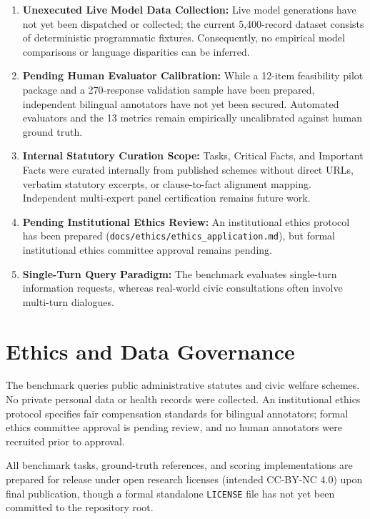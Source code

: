 \documentclass[11pt,a4paper]{article}
\begin{document}
\begin{enumerate}
  \item \textbf{Unexecuted Live Model Data Collection:} Live model generations have not yet been dispatched or collected; the current 5,400-record dataset consists of deterministic programmatic fixtures. Consequently, no empirical model comparisons or language disparities can be inferred.
  \item \textbf{Pending Human Evaluator Calibration:} While a 12-item feasibility pilot package and a 270-response validation sample have been prepared, independent bilingual annotators have not yet been secured. Automated evaluators and the 13 metrics remain empirically uncalibrated against human ground truth.
  \item \textbf{Internal Statutory Curation Scope:} Tasks, Critical Facts, and Important Facts were curated internally from published schemes without direct URLs, verbatim statutory excerpts, or clause-to-fact alignment mapping. Independent multi-expert panel certification remains future work.
  \item \textbf{Pending Institutional Ethics Review:} An institutional ethics protocol has been prepared (\texttt{docs/ethics/ethics\_application.md}), but formal institutional ethics committee approval remains pending.
  \item \textbf{Single-Turn Query Paradigm:} The benchmark evaluates single-turn information requests, whereas real-world civic consultations often involve multi-turn dialogues.
\end{enumerate}

\section{Ethics and Data Governance}
\label{sec:ethics}

The benchmark queries public administrative statutes and civic welfare schemes. No private personal data or health records were collected. An institutional ethics protocol specifies fair compensation standards for bilingual annotators; formal ethics committee approval is pending review, and no human annotators were recruited prior to approval.

All benchmark tasks, ground-truth references, and scoring implementations are prepared for release under open research licenses (intended CC-BY-NC 4.0) upon final publication, though a formal standalone \texttt{LICENSE} file has not yet been committed to the repository root.
\end{document}
